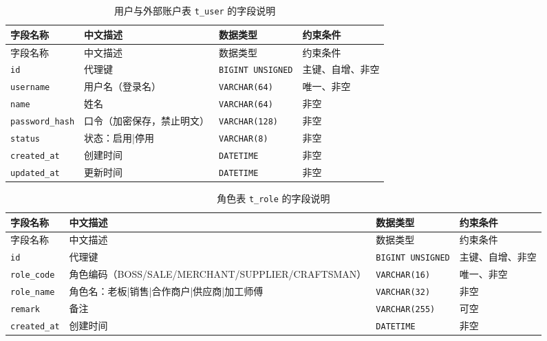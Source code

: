 \documentclass[12pt, a4paper]{ctexart}
\newcommand{\code}[1]{\texttt{\small #1}}
\begin{document}
\begin{longtable}{@{}p{3.1cm} p{4.5cm} p{2.4cm} p{4.5cm}@{}}
\caption{用户与外部账户表 \code{t\_user} 的字段说明}\label{tab:f-t-user}\\
\toprule
字段名称 & 中文描述 & 数据类型 & 约束条件 \\
\midrule
\endfirsthead
\toprule
字段名称 & 中文描述 & 数据类型 & 约束条件 \\
\midrule
\endhead
\bottomrule
\endlastfoot
\code{id} & 代理键 & \code{BIGINT UNSIGNED} & 主键、自增、非空 \\
\code{username} & 用户名（登录名） & \code{VARCHAR(64)} & 唯一、非空 \\
\code{name} & 姓名 & \code{VARCHAR(64)} & 非空 \\
\code{password\_hash} & 口令（加密保存，禁止明文） & \code{VARCHAR(128)} & 非空 \\
\code{status} & 状态：启用|停用 & \code{VARCHAR(8)} & 非空 \\
\code{created\_at} & 创建时间 & \code{DATETIME} & 非空 \\
\code{updated\_at} & 更新时间 & \code{DATETIME} & 非空 \\
\end{longtable}

\begin{longtable}{@{}p{3.1cm} p{4.5cm} p{2.4cm} p{4.5cm}@{}}
\caption{角色表 \code{t\_role} 的字段说明}\label{tab:f-t-role}\\
\toprule
字段名称 & 中文描述 & 数据类型 & 约束条件 \\
\midrule
\endfirsthead
\toprule
字段名称 & 中文描述 & 数据类型 & 约束条件 \\
\midrule
\endhead
\bottomrule
\endlastfoot
\code{id} & 代理键 & \code{BIGINT UNSIGNED} & 主键、自增、非空 \\
\code{role\_code} & 角色编码（BOSS/SALE/MERCHANT/SUPPLIER/CRAFTSMAN） & \code{VARCHAR(16)} & 唯一、非空 \\
\code{role\_name} & 角色名：老板|销售|合作商户|供应商|加工师傅 & \code{VARCHAR(32)} & 非空 \\
\code{remark} & 备注 & \code{VARCHAR(255)} & 可空 \\
\code{created\_at} & 创建时间 & \code{DATETIME} & 非空 \\
\end{longtable}
\end{document}

